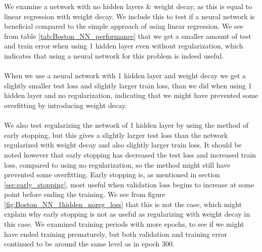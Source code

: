 \begin{table} \label{tab:Boston_NN_performance}
\caption{Performance measurement for Neural Network models on Boston Housing data. Early stopping ran 255 epochs with patience 10 and $\delta_{\text{min}}=0.1$. For weight decay on all networks we select $\alpha = 0.3$ as regularization constant. }
\end{table}

\noindent
We examine a network with no hidden layers \& weight decay, as this is equal to linear regression with weight decay. We include this to test if a neural network is beneficial compared to the simple approach of using linear regression. We see from table \ref{tab:Boston_NN_performance} that we get a smaller amount of test and train error when using 1 hidden layer even without regularization, which indicates that using a neural network for this problem is indeed useful.
\\
\\
When we use a neural network with 1 hidden layer and weight decay we get a slightly smaller test loss and slightly larger train loss, than we did when using 1 hidden layer and no regularization, indicating that we might have prevented some overfitting by introducing weight decay. 
\\
\\
We also test regularizing the network of 1 hidden layer by using the method of early stopping, but this gives a slightly larger test loss than the network regularized with weight decay and also slightly larger train loss. It should be noted however that early stopping has decreased the test loss and increased train loss, compared to using no regularization, so the method might still have prevented some overfitting.
Early stopping is, as mentioned in section \ref{sec:early_stopping}, most useful when validation loss begins to increase at some point before ending the training. We see from figure \ref{fig:Boston_NN_1hidden_noreg_loss} that this is not the case, which might explain why early stopping is not as useful as regularizing with weight decay in this case. We examined training periods with more epochs, to see if we might have ended training prematurely, but both validation and training error continued to be around the same level as in epoch 300. 



